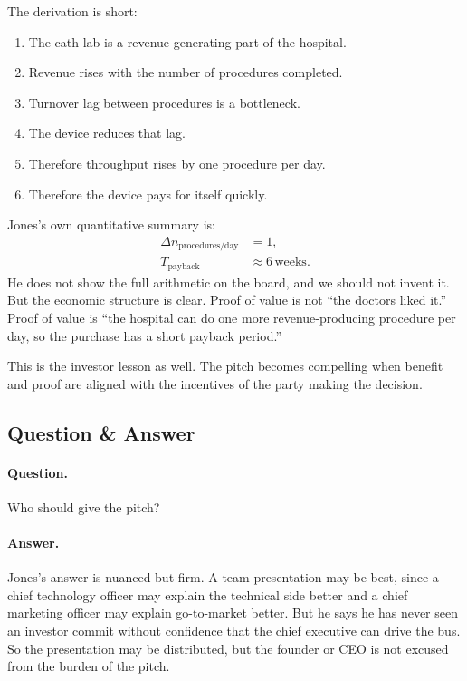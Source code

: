 The derivation is short:
\begin{enumerate}
\item The cath lab is a revenue-generating part of the hospital.
\item Revenue rises with the number of procedures completed.
\item Turnover lag between procedures is a bottleneck.
\item The device reduces that lag.
\item Therefore throughput rises by one procedure per day.
\item Therefore the device pays for itself quickly.
\end{enumerate}
Jones's own quantitative summary is:
\begin{align}
\Delta n_{\text{procedures/day}} &= 1,\\
T_{\text{payback}} &\approx 6\,\text{weeks}.
\end{align}
He does not show the full arithmetic on the board, and we should not invent it. But the economic structure is clear. Proof of value is not “the doctors liked it.” Proof of value is “the hospital can do one more revenue-producing procedure per day, so the purchase has a short payback period.”

This is the investor lesson as well. The pitch becomes compelling when benefit and proof are aligned with the incentives of the party making the decision.

\subsection{Question \& Answer}

\paragraph{Question.} Who should give the pitch?

\paragraph{Answer.} Jones's answer is nuanced but firm. A team presentation may be best, since a chief technology officer may explain the technical side better and a chief marketing officer may explain go-to-market better. But he says he has never seen an investor commit without confidence that the chief executive can drive the bus. So the presentation may be distributed, but the founder or CEO is not excused from the burden of the pitch.

